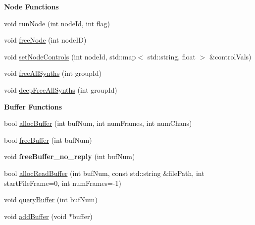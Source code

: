 \begin{Indent}{\bf Node Functions}
\begin{DoxyCompactItemize}
\item 
void \hyperlink{classColliderPlusPlus_1_1Client__Server_a7d0b2e32ba54f6466f158b0308c5adfa}{run\-Node} (int node\-Id, int flag)
\item 
void \hyperlink{classColliderPlusPlus_1_1Client__Server_a2493feaae216ec17356a9c49794d6b6f}{free\-Node} (int node\-I\-D)
\item 
void \hyperlink{classColliderPlusPlus_1_1Client__Server_afbcd572869652e6e7ec7af430b70f2f7}{set\-Node\-Controls} (int node\-Id, std\-::map$<$ std\-::string, float $>$ \&control\-Vals)
\item 
void \hyperlink{classColliderPlusPlus_1_1Client__Server_a2354779039abcdcf4ccabbef7ab31fe3}{free\-All\-Synths} (int group\-Id)
\item 
void \hyperlink{classColliderPlusPlus_1_1Client__Server_a9bdb9d888e862aa0b9c0d692e76506c0}{deep\-Free\-All\-Synths} (int group\-Id)
\end{DoxyCompactItemize}
\end{Indent}
\begin{Indent}{\bf Buffer Functions}\par
\begin{DoxyCompactItemize}
\item 
bool \hyperlink{classColliderPlusPlus_1_1Client__Server_a511c53f224101c1dd086cf20bf396822}{alloc\-Buffer} (int buf\-Num, int num\-Frames, int num\-Chans)
\item 
bool \hyperlink{classColliderPlusPlus_1_1Client__Server_a7785de881ed0fba7629063d897a03f07}{free\-Buffer} (int buf\-Num)
\item 
\hypertarget{classColliderPlusPlus_1_1Client__Server_ac58411b6c4fbc173c4ff7905ff362a11}{void {\bfseries free\-Buffer\-\_\-no\-\_\-reply} (int buf\-Num)}\label{classColliderPlusPlus_1_1Client__Server_ac58411b6c4fbc173c4ff7905ff362a11}

\item 
bool \hyperlink{classColliderPlusPlus_1_1Client__Server_a362e7f78f317e4071d02cf0a432c066a}{alloc\-Read\-Buffer} (int buf\-Num, const std\-::string \&file\-Path, int start\-File\-Frame=0, int num\-Frames=-\/1)
\item 
void \hyperlink{classColliderPlusPlus_1_1Client__Server_a8813b8acfb68ee8e75486303ba373f23}{query\-Buffer} (int buf\-Num)
\item 
void \hyperlink{classColliderPlusPlus_1_1Client__Server_aaa911e54750f185b428f05ccd4c22b9e}{add\-Buffer} (void $\ast$buffer)
\end{DoxyCompactItemize}
\end{Indent}



